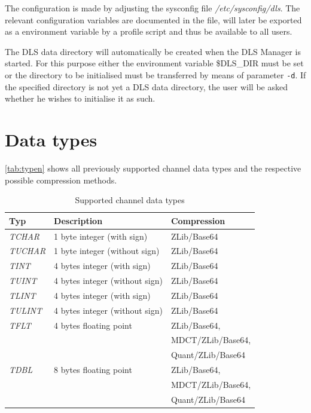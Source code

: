 \documentclass[a4paper,12pt,BCOR6mm,bibtotoc,idxtotoc]{scrbook}
\begin{document}
The configuration is made by adjusting the sysconfig file \textit{/etc/sysconfig/dls}. The relevant configuration variables are documented in the file, will later be exported as a environment variable by a profile script and thus be available to all users.

The DLS data directory will automatically be created when the DLS Manager is started. For this purpose either the environment variable \$DLS\_DIR must be set or the directory to be initialised must be transferred by means of parameter \texttt{-d}. If the specified directory is not yet a DLS data directory, the user will be asked whether he wishes to initialise it as such.


\chapter{Data types} \label{sec:apx_types}

\autoref{tab:typen} shows all previously supported channel data
types and the respective possible compression methods.

\begin{table}[htb] \centering \caption{Supported channel data types} \label{tab:typen} \vspace{1.5ex} \begin{tabular}[thb]{|l|l|l|} \hline \textbf{Typ} & \textbf{Description} & \textbf{Compression}\\ \hline \textit{TCHAR} & 1 byte integer (with sign) & ZLib/Base64\\ \hline \textit{TUCHAR} & 1 byte integer (without sign) & ZLib/Base64\\ \hline \textit{TINT} & 4 bytes integer (with sign) & ZLib/Base64\\ \hline \textit{TUINT} & 4 bytes integer (without sign) & ZLib/Base64\\ \hline \textit{TLINT} & 4 bytes integer (with sign) & ZLib/Base64\\ \hline \textit{TULINT} & 4 bytes integer (without sign) & ZLib/Base64\\ \hline \textit{TFLT} & 4 bytes floating point & ZLib/Base64,\\ & & MDCT/ZLib/Base64,\\ & & Quant/ZLib/Base64\\ \hline \textit{TDBL} & 8 bytes floating point & ZLib/Base64,\\ & & MDCT/ZLib/Base64,\\ & & Quant/ZLib/Base64\\ \hline \end{tabular} \end{table}
\end{document}
